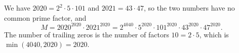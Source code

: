 We have $2020=2^2\cdot5\cdot101$ and $2021=43\cdot47$, so the two numbers have no common prime factor, and
\[M=2020^{2020}\cdot2021^{2020}=2^{4040}\cdot5^{2020}\cdot101^{2020}\cdot43^{2020}\cdot47^{2020}.\]
The number of trailing zeros is the number of factors $10=2\cdot5$, which is $\min(4040,2020)=\boxed{2020}$.
